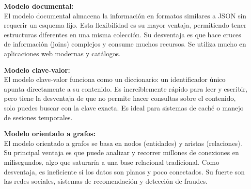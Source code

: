 \documentclass[12pt,a4paper]{article}
\begin{document}
\textbf{Modelo documental:} \\
El modelo documental almacena la información en formatos similares a JSON sin requerir un esquema fijo. Esta flexibilidad es su mayor ventaja, permitiendo tener estructuras diferentes en una misma colección. Su desventaja es que hace cruces de información (joins) complejos y consume muchos recursos. Se utiliza mucho en aplicaciones web modernas y catálogos.

\textbf{Modelo clave-valor:} \\
El modelo clave-valor funciona como un diccionario: un identificador único apunta directamente a su contenido. Es increíblemente rápido para leer y escribir, pero tiene la desventaja de que no permite hacer consultas sobre el contenido, solo puedes buscar con la clave exacta. Es ideal para sistemas de caché o manejo de sesiones temporales.

\textbf{Modelo orientado a grafos:} \\
El modelo orientado a grafos se basa en nodos (entidades) y aristas (relaciones). Su principal ventaja es que puede analizar y recorrer millones de conexiones en milisegundos, algo que saturaría a una base relacional tradicional. Como desventaja, es ineficiente si los datos son planos y poco conectados. Su fuerte son las redes sociales, sistemas de recomendación y detección de fraudes.
\end{document}
